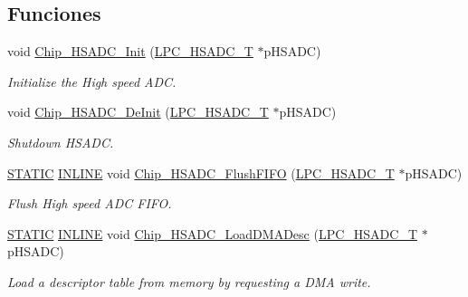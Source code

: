 \subsection*{Funciones}
\begin{DoxyCompactItemize}
\item 
void \hyperlink{group___h_s_a_d_c__18_x_x__43_x_x_gad72fb94bbb485c84687a4e75c63090ea}{Chip\+\_\+\+H\+S\+A\+D\+C\+\_\+\+Init} (\hyperlink{struct_l_p_c___h_s_a_d_c___t}{L\+P\+C\+\_\+\+H\+S\+A\+D\+C\+\_\+T} $\ast$p\+H\+S\+A\+DC)
\begin{DoxyCompactList}\small\item\em Initialize the High speed A\+DC. \end{DoxyCompactList}\item 
void \hyperlink{group___h_s_a_d_c__18_x_x__43_x_x_ga2d9740d012a9043c462acbc468e1931d}{Chip\+\_\+\+H\+S\+A\+D\+C\+\_\+\+De\+Init} (\hyperlink{struct_l_p_c___h_s_a_d_c___t}{L\+P\+C\+\_\+\+H\+S\+A\+D\+C\+\_\+T} $\ast$p\+H\+S\+A\+DC)
\begin{DoxyCompactList}\small\item\em Shutdown H\+S\+A\+DC. \end{DoxyCompactList}\item 
\hyperlink{group___l_p_c___types___public___macros_ga10b2d890d871e1489bb02b7e70d9bdfb}{S\+T\+A\+T\+IC} \hyperlink{spifi__18xx__43xx_8h_a2eb6f9e0395b47b8d5e3eeae4fe0c116}{I\+N\+L\+I\+NE} void \hyperlink{group___h_s_a_d_c__18_x_x__43_x_x_ga9b6a95c8e73bf397768ea3f97ed7de25}{Chip\+\_\+\+H\+S\+A\+D\+C\+\_\+\+Flush\+F\+I\+FO} (\hyperlink{struct_l_p_c___h_s_a_d_c___t}{L\+P\+C\+\_\+\+H\+S\+A\+D\+C\+\_\+T} $\ast$p\+H\+S\+A\+DC)
\begin{DoxyCompactList}\small\item\em Flush High speed A\+DC F\+I\+FO. \end{DoxyCompactList}\item 
\hyperlink{group___l_p_c___types___public___macros_ga10b2d890d871e1489bb02b7e70d9bdfb}{S\+T\+A\+T\+IC} \hyperlink{spifi__18xx__43xx_8h_a2eb6f9e0395b47b8d5e3eeae4fe0c116}{I\+N\+L\+I\+NE} void \hyperlink{group___h_s_a_d_c__18_x_x__43_x_x_gab01d315ee383688f0dea4aa939e5220f}{Chip\+\_\+\+H\+S\+A\+D\+C\+\_\+\+Load\+D\+M\+A\+Desc} (\hyperlink{struct_l_p_c___h_s_a_d_c___t}{L\+P\+C\+\_\+\+H\+S\+A\+D\+C\+\_\+T} $\ast$p\+H\+S\+A\+DC)
\begin{DoxyCompactList}\small\item\em Load a descriptor table from memory by requesting a D\+MA write. \end{DoxyCompactList}\item 

\end{DoxyCompactItemize}
